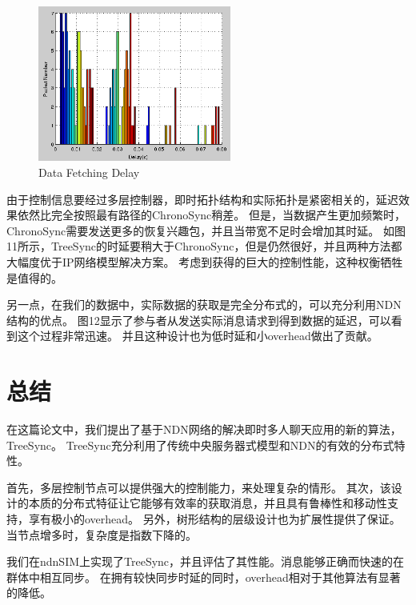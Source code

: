 \documentclass[a4paper]{article}
\begin{document}
\begin{figure}[!t]
\centering
\includegraphics[width=2.5in]{../png/data-fetch-delay.png}
\caption{Data Fetching Delay}
\label{data_fetch_delay}
\end{figure}

由于控制信息要经过多层控制器，即时拓扑结构和实际拓扑是紧密相关的，延迟效果依然比完全按照最有路径的ChronoSync稍差。
但是，当数据产生更加频繁时，ChronoSync需要发送更多的恢复兴趣包，并且当带宽不足时会增加其时延。
如图11所示，TreeSync的时延要稍大于ChronoSync，但是仍然很好，并且两种方法都大幅度优于IP网络模型解决方案。
考虑到获得的巨大的控制性能，这种权衡牺牲是值得的。

另一点，在我们的数据中，实际数据的获取是完全分布式的，可以充分利用NDN结构的优点。
图12显示了参与者从发送实际消息请求到得到数据的延迟，可以看到这个过程非常迅速。
并且这种设计也为低时延和小overhead做出了贡献。

\section{总结}

在这篇论文中，我们提出了基于NDN网络的解决即时多人聊天应用的新的算法，TreeSync。
TreeSync充分利用了传统中央服务器式模型和NDN的有效的分布式特性。

首先，多层控制节点可以提供强大的控制能力，来处理复杂的情形。
其次，该设计的本质的分布式特征让它能够有效率的获取消息，并且具有鲁棒性和移动性支持，享有极小的overhead。
另外，树形结构的层级设计也为扩展性提供了保证。当节点增多时，复杂度是指数下降的。

我们在ndnSIM上实现了TreeSync，并且评估了其性能。消息能够正确而快速的在群体中相互同步。
在拥有较快同步时延的同时，overhead相对于其他算法有显著的降低。
\end{document}
